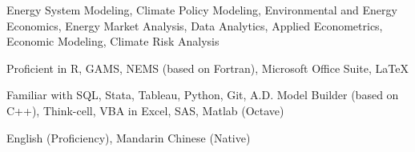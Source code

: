 


\begin{pubitems} %
    \item {Energy System Modeling, Climate Policy Modeling, Environmental and Energy Economics, Energy Market Analysis, Data Analytics, Applied Econometrics, Economic Modeling, Climate Risk Analysis}
\end{pubitems}



\begin{pubitems} %
    \item {Proficient in R, GAMS, NEMS (based on Fortran), Microsoft Office Suite, \LaTeX}
    \item {Familiar with SQL, Stata, Tableau, Python, Git, A.D. Model Builder (based on C++), Think-cell, VBA in Excel, SAS, Matlab (Octave)}
\end{pubitems}




\begin{pubitems} %
    \item {English (Proficiency), Mandarin Chinese (Native)}
\end{pubitems}


